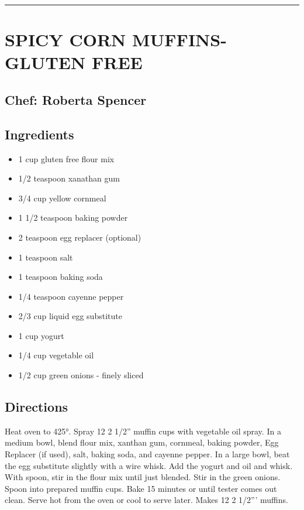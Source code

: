 \documentclass[
]{book}
\providecommand{\tightlist}{%
  \setlength{\itemsep}{0pt}\setlength{\parskip}{0pt}}
\begin{document}
\begin{center}\rule{0.5\linewidth}{0.5pt}\end{center}

\hypertarget{spicy-corn-muffins-gluten-free}{%
\section*{SPICY CORN MUFFINS-GLUTEN FREE}\label{spicy-corn-muffins-gluten-free}}


\hypertarget{chef-roberta-spencer-27}{%
\subsection*{Chef: Roberta Spencer}\label{chef-roberta-spencer-27}}


\hypertarget{ingredients-80}{%
\subsection*{Ingredients}\label{ingredients-80}}


\begin{itemize}
\tightlist
\item
  1 cup gluten free flour mix
\item
  1/2 teaspoon xanathan gum
\item
  3/4 cup yellow cornmeal
\item
  1 1/2 teaspoon baking powder
\item
  2 teaspoon egg replacer (optional)
\item
  1 teaspoon salt
\item
  1 teaspoon baking soda
\item
  1/4 teaspoon cayenne pepper
\item
  2/3 cup liquid egg substitute
\item
  1 cup yogurt
\item
  1/4 cup vegetable oil
\item
  1/2 cup green onions - finely sliced
\end{itemize}

\hypertarget{directions-80}{%
\subsection*{Directions}\label{directions-80}}


Heat oven to 425°. Spray 12 2 1/2'' muffin cups with vegetable oil spray. In a medium bowl, blend flour mix, xanthan gum, cornmeal, baking powder, Egg Replacer (if used), salt, baking soda, and cayenne pepper. In a large bowl, beat the egg substitute slightly with a wire whisk. Add the yogurt and oil and whisk. With spoon, stir in the flour mix until just blended. Stir in the green onions. Spoon into prepared muffin cups. Bake 15 minutes or until tester comes out clean. Serve hot from the oven or cool to serve later. Makes 12 2 1/2''' muffins.
\end{document}
